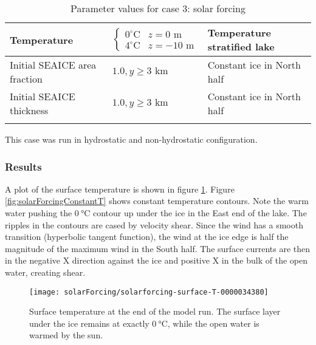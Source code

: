 \documentclass[11pt]{article}
\begin{document}
\begin{longtable}{  p{}  p{}  p{}  }
Temperature & \begin{equation*} \begin{cases} 0^{\circ} \text{C} & z = 0 \text{ m} \\ 4 ^{\circ} \text{C} & z = -10 \text{ m}   \end{cases} \end{equation*} & Temperature stratified lake \\ \hline
Initial SEAICE area fraction   & $1.0, y \geq 3 \text{ km}$ & Constant ice in North half \\ \hline
Initial SEAICE thickness    & $1.0, y \geq 3 \text{ km}$ & Constant ice in North half \\ \hline

\caption{Parameter values for case 3: solar forcing}
\label{table:solarForcing}
\end{longtable}
This case was run in hydrostatic and non-hydrostatic configuration.

\subsubsection{Results}
A plot of the surface temperature is shown in figure \ref{fig:solarForcingSurfaceT}. Figure \ref{fig:solarForcingConstantT} shows constant temperature contours. Note the warm water pushing the $\SI{0}{\celsius}$ contour up under the ice in the East end of the lake. The ripples in the contours are cased by velocity shear. Since the wind has a smooth transition (hyperbolic tangent function), the wind at the ice edge is half the magnitude of the maximum wind in the South half. The surface currents are then in the negative X direction against the ice and positive X in the bulk of the open water, creating shear.

\begin{figure}[h!]
\centering
\texttt{[image: solarForcing/solarforcing-surface-T-0000034380]}
\caption{Surface temperature at the end of the model run. The surface layer under the ice remains at exactly $\SI{0}{\celsius}$, while the open water is warmed by the sun.}
\label{fig:solarForcingSurfaceT}
\end{figure}
\end{document}
